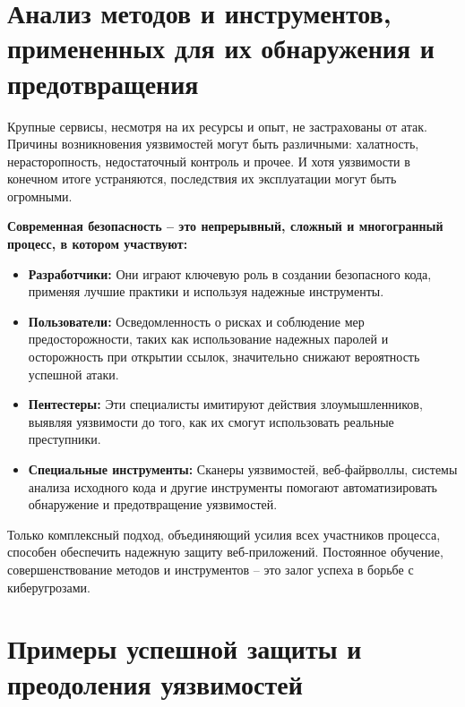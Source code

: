 \documentclass[a4paper,12pt]{diplom}
\begin{document}
	 
	 
	 
	 
	 
	 
	 
	 
	 
	 
	 \section{Анализ методов и инструментов, примененных для их обнаружения и предотвращения}
	 
	 Крупные сервисы, несмотря на их ресурсы и опыт, не застрахованы от атак. Причины возникновения уязвимостей могут быть различными: халатность, нерасторопность, недостаточный контроль и прочее. И хотя уязвимости в конечном итоге устраняются, последствия их эксплуатации могут быть огромными.
	 
	 \bigskip
	 
	 \textbf{Современная безопасность – это непрерывный, сложный и многогранный процесс, в котором участвуют:}
	 
	 \begin{itemize}
	 	\item \textbf{Разработчики:} Они играют ключевую роль в создании безопасного кода, применяя лучшие практики и используя надежные инструменты. 
	 	\item \textbf{Пользователи:} Осведомленность о рисках и соблюдение мер предосторожности, таких как использование надежных паролей и осторожность при открытии ссылок, значительно снижают вероятность успешной атаки.
	 	\item \textbf{Пентестеры:} Эти специалисты имитируют действия злоумышленников, выявляя уязвимости до того, как их смогут использовать реальные преступники. 
	 	\item \textbf{Специальные инструменты:} Сканеры уязвимостей, веб-файрволлы, системы анализа исходного кода и другие инструменты помогают автоматизировать обнаружение и предотвращение уязвимостей.
	 \end{itemize}
	 
	 \bigskip
	 
	 Только комплексный подход, объединяющий усилия всех участников процесса, способен обеспечить надежную защиту веб-приложений.  Постоянное обучение, совершенствование методов и инструментов – это залог успеха в борьбе с киберугрозами.
	 
	 
	 
	 \section{Примеры успешной защиты и преодоления уязвимостей}
	 
\end{document}
